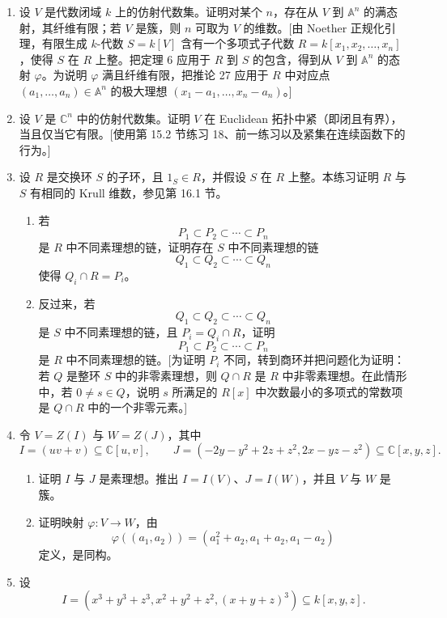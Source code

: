 \begin{enumerate}[label=\arabic*.]
	下一个练习给出 Noether 正规化引理的“几何”解释，说明每个仿射代数集都是某个仿射 $n$-空间的有限覆盖。
	
	\item 设 $V$ 是代数闭域 $k$ 上的仿射代数集。证明对某个 $n$，存在从 $V$ 到 $\mathbb A^n$ 的满态射，其纤维有限；若 $V$ 是簇，则 $n$ 可取为 $V$ 的维数。[由 Noether 正规化引理，有限生成 $k$-代数 $S=k[V]$ 含有一个多项式子代数 $R=k[x_1,x_2,
	\ldots,x_n]$，使得 $S$ 在 $R$ 上整。把定理 6 应用于 $R$ 到 $S$ 的包含，得到从 $V$ 到 $\mathbb A^n$ 的态射 $\varphi$。为说明 $\varphi$ 满且纤维有限，把推论 27 应用于 $R$ 中对应点 $(a_1,
	\ldots,a_n)\in\mathbb A^n$ 的极大理想 $(x_1-a_1,
	\ldots,x_n-a_n)$。]
	\item 设 $V$ 是 $\mathbb C^n$ 中的仿射代数集。证明 $V$ 在 Euclidean 拓扑中紧（即闭且有界），当且仅当它有限。[使用第 15.2 节练习 18、前一练习以及紧集在连续函数下的行为。]
	\item 设 $R$ 是交换环 $S$ 的子环，且 $1_S\in R$，并假设 $S$ 在 $R$ 上整。本练习证明 $R$ 与 $S$ 有相同的 Krull 维数，参见第 16.1 节。
	\begin{enumerate}[label=(\alph*)]
		\item 若
		\[
		P_1\subset P_2\subset\cdots\subset P_n
		\]
		是 $R$ 中不同素理想的链，证明存在 $S$ 中不同素理想的链
		\[
		Q_1\subset Q_2\subset\cdots\subset Q_n
		\]
		使得 $Q_i\cap R=P_i$。
		\item 反过来，若
		\[
		Q_1\subset Q_2\subset\cdots\subset Q_n
		\]
		是 $S$ 中不同素理想的链，且 $P_i=Q_i\cap R$，证明
		\[
		P_1\subset P_2\subset\cdots\subset P_n
		\]
		是 $R$ 中不同素理想的链。[为证明 $P_i$ 不同，转到商环并把问题化为证明：若 $Q$ 是整环 $S$ 中的非零素理想，则 $Q\cap R$ 是 $R$ 中非零素理想。在此情形中，若 $0\ne s\in Q$，说明 $s$ 所满足的 $R[x]$ 中次数最小的多项式的常数项是 $Q\cap R$ 中的一个非零元素。]
	\end{enumerate}
	\item 令 $V=Z(I)$ 与 $W=Z(J)$，其中
	\[
	I=(uv+v)\subseteq\mathbb C[u,v],
	\qquad
	J=(-2y-y^2+2z+z^2,
	2x-yz-z^2)\subseteq\mathbb C[x,y,z].
	\]
	\begin{enumerate}[label=(\alph*)]
		\item 证明 $I$ 与 $J$ 是素理想。推出 $I=I(V)$、$J=I(W)$，并且 $V$ 与 $W$ 是簇。
		\item 证明映射 $\varphi:V\to W$，由
		\[
		\varphi((a_1,a_2))=(a_1^2+a_2,
		a_1+a_2,
		a_1-a_2)
		\]
		定义，是同构。
	\end{enumerate}
	\item 设
	\[
	I=(x^3+y^3+z^3,
	x^2+y^2+z^2,
	(x+y+z)^3)\subseteq k[x,y,z].
\]
\end{enumerate}
